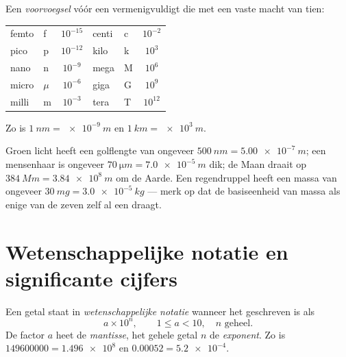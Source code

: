 \begin{definition}[SI-voorvoegsels]\label{def:g10:orders-of-magnitude:prefixes}
Een \emph{voorvoegsel} vóór een 
vermenigvuldigt die  met een vaste macht van tien:
\begin{center}
\begin{tabular}{llc@{\qquad\qquad}llc}
femto & f & $10^{-15}$ & centi & c & $10^{-2}$ \\
pico  & p & $10^{-12}$ & kilo  & k & $10^{3}$  \\
nano  & n & $10^{-9}$  & mega  & M & $10^{6}$  \\
micro & $\mu$ & $10^{-6}$ & giga & G & $10^{9}$ \\
milli & m & $10^{-3}$  & tera  & T & $10^{12}$ \\
\end{tabular}
\end{center}
Zo is $\qty{1}{nm} = \qty{e-9}{m}$ en $\qty{1}{km} = \qty{e3}{m}$.
\end{definition}

\begin{example}\label{ex:g10:orders-of-magnitude:prefixes}
Groen licht heeft een golflengte van ongeveer
$\qty{500}{nm} = \qty{5.00e-7}{m}$; een mensenhaar is ongeveer
$\qty{70}{\micro m} = \qty{7.0e-5}{m}$ dik; de Maan draait op
$\qty{384}{Mm} = \qty{3.84e8}{m}$ om de Aarde. Een regendruppel heeft
een massa van ongeveer $\qty{30}{mg} = \qty{3.0e-5}{kg}$ --- merk op
dat de basiseenheid van massa als enige van de zeven zelf al een
 draagt.
\end{example}

\section{Wetenschappelijke notatie en significante cijfers}

\begin{definition}\label{def:g10:orders-of-magnitude:scinot}
Een getal staat in \emph{wetenschappelijke notatie} wanneer het geschreven is als
\[
a \times 10^{n}, \qquad 1 \leq a < 10, \quad n \text{ geheel.}
\]
De factor $a$ heet de \emph{mantisse}, het gehele
getal $n$ de \emph{exponent}.
Zo is $\num{149600000} = \num{1.496e8}$ en
$\num{0.00052} = \num{5.2e-4}$.
\end{definition}

